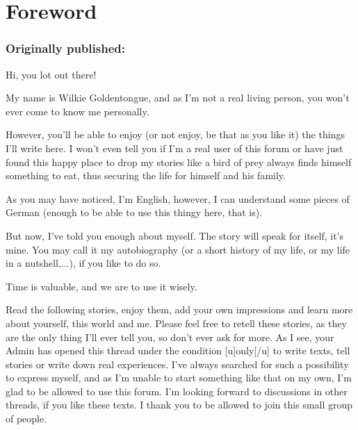 \frontmatter
\chapter{Foreword}
\label{cha:foreword}
\subsection*{Originally published: }
Hi, you lot out there!

My name is Wilkie Goldentongue, and as I'm not a real living person, you won't ever come to know me personally.

However, you'll be able to enjoy (or not enjoy, be that as you like it) the things I'll write here.
I won't even tell you if I'm a real user of this forum or have just found this happy place to drop my stories like a bird of prey always finds himself something to eat, thus securing the life for himself and his family.

As you may have noticed, I'm English, however, I can understand some pieces of German (enough to be able to use this thingy here, that is). 

But now, I've told you enough about myself. The story will speak for itself, it's mine. You may call it my autobiography (or a short history of my life, or my life in a nutshell,...), if you like to do so. 

Time is valuable, and we are to use it wisely. 

Read the following stories, enjoy them, add your own impressions and learn more about yourself, this world and me. Please feel free to retell these stories, as they are the only thing I'll ever tell you, so don't ever ask for more. As I see, your Admin has opened this thread under the condition [u]only[/u] to write texts, tell stories or write down real experiences. I've always searched for such a possibility to express myself, and as I'm unable to start something like that on my own, I'm glad to be allowed to use this forum. I'm looking forward to discussions in other threads, if you like these texts. I thank you to be allowed to join this small group of people. 
